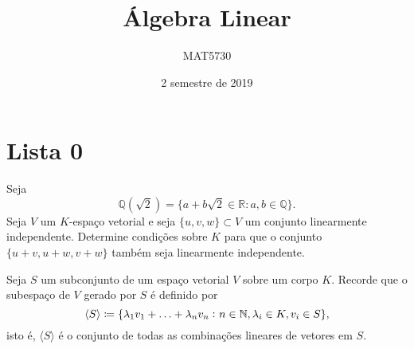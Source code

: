 \documentclass[11pt,a4paper]{article}
\title{Álgebra Linear}
\author{MAT5730}
\date{2 semestre de 2019}
\begin{document}
\maketitle
\tableofcontents
\newpage
\begin{comment}

\begin{center}
\large\textbf{\textcolor{Floresta}{Lista 1}}\\
\end{center}

\end{comment}

\section{\textcolor{Floresta}{Lista 0}}

 Seja
\[
\mathbb{Q}(\sqrt{2}) = \{ a + b \sqrt{2} \in \mathbb{R} : a,b \in \mathbb{Q} \}.
\]
 Seja $V$ um $K$-espaço vetorial e seja $\{u, v, w\} \subset V$ um conjunto linearmente independente.
Determine condições sobre $K$ para que o conjunto $\{u + v, u + w, v + w\}$ também seja linearmente independente.

 Seja \(S\) um subconjunto de um espaço vetorial \(V\)
sobre um corpo \(K\). Recorde que o subespaço de \(V\) gerado por \(S\)
é definido por
\[\langle S\rangle\coloneqq\{\lambda_1v_1+\ldots+\lambda_nv_n\,\colon
  n\in\mathbb{N}, \lambda_i\in K, v_i\in S\},\]
isto é, \(\langle S\rangle\) é o conjunto de todas as
combinações lineares de vetores em \(S\).

\end{document}
